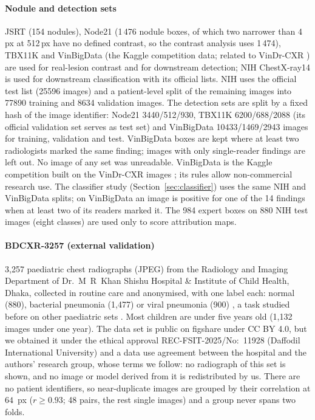 \paragraph{Nodule and detection sets} JSRT \citep{shiraishi2000jsrt} (154 nodules), Node21 \citep{sogancioglu2024node21} (1\,476 nodule boxes,
of which two narrower than 4\,px at 512\,px have no defined contrast, so the contrast analysis uses 1\,474),
TBX11K \citep{liu2020tbx11k} and VinBigData (the Kaggle competition data; related to VinDr-CXR \citep{nguyen2022vindrcxr}) are used for real-lesion contrast
and for downstream detection; NIH ChestX-ray14 \citep{wang2017chestxray} is used for downstream classification with its official lists.
NIH uses the official test list (\num{25596} images) and a patient-level split of the remaining images into \num{77890} training and \num{8634}
validation images. The detection sets are split by a fixed hash of the image identifier: Node21 \num{3440}/\num{512}/\num{930}, TBX11K
\num{6200}/\num{688}/\num{2088} (its official validation set serves as test set) and VinBigData \num{10433}/\num{1469}/\num{2943} images for
training, validation and test. VinBigData boxes are kept where at least two radiologists marked the same finding; images with only single-reader
findings are left out. No image of any set was unreadable. VinBigData is the Kaggle competition built on the VinDr-CXR images \citep{vinbigdata2020kaggle}; its rules allow non-commercial research use.
The classifier study (Section~\ref{sec:classifier}) uses the same NIH and VinBigData splits; on VinBigData an image is positive for one of the
14 findings when at least two of its readers marked it. The 984 expert boxes on 880 NIH test images (eight classes) are used only to score
attribution maps.

\paragraph{BDCXR-3257 (external validation)} 3,257 paediatric chest radiographs (JPEG) from the Radiology and Imaging Department of
Dr.~M~R~Khan Shishu Hospital \& Institute of Child Health, Dhaka, collected in routine care and anonymised, with one label each: normal (880),
bacterial pneumonia (1,477) or viral pneumonia (900) \citep{durjoy2026bdcxr}, a task studied before on other paediatric sets \citep{kermany2018identifying}. Most children are under five years old
(1,132 images under one year). The data set is public on figshare under CC BY 4.0, but we obtained it under the ethical approval REC-FSIT-2025/No:~11928 (Daffodil
International University) and a data use agreement between the hospital and the authors' research group, whose terms we follow: no
radiograph of this set is shown, and no image or model derived from it is redistributed by us. There are no
patient identifiers, so near-duplicate images are grouped by their correlation at $64$~px ($r\ge0.93$; 48 pairs, the rest single images) and
a group never spans two folds.

